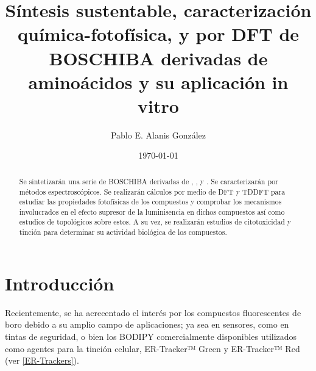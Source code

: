 \documentclass[spanish,mexico]{scrartcl}
\title{Síntesis sustentable, caracterización química-fotofísica, y por {DFT} de {BOSCHIBA} derivadas de aminoácidos y su aplicación in vitro}
\date{\today}
\author{Pablo E. Alanis González}
\begin{document}
\linenumbers{}
\maketitle

\begin{abstract}
    Se sintetizarán una serie de \gls{BOSCHIBA} derivadas de , ,  y . Se caracterizarán por métodos espectroscópicos. Se realizarán cálculos \insilico{} por medio de \gls{DFT} y \gls{TDDFT} para estudiar las propiedades fotofísicas de los compuestos y comprobar los mecanismos involucrados en el efecto supresor de la luminisencia en dichos compuestos así como estudios de topológicos sobre estos. A su vez, se realizarán estudios de citotoxicidad y tinción \invitro{} para determinar su actividad biológica de los compuestos.
\end{abstract}

\newpage
\tableofcontents
\listoffigures
\listoftables
\listofschemes

\section{Introducción}

Recientemente, se ha acrecentado el interés por los compuestos fluorescentes de boro debido a su amplio campo de aplicaciones; \autocite{ibarra-rodriguezOrganoboronSchiffBases2019} ya sea en sensores, como en tintas de seguridad, o bien los \gls{BODIPY} comercialmente disponibles utilizados como agentes para la tinción celular, ER-Tracker™ Green y ER-Tracker™ Red (ver \cref{ER-Trackers}).
\end{document}
